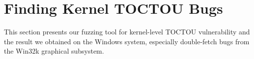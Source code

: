 \section{Finding Kernel TOCTOU Bugs}
\label{sec:experiment}





This section presents our fuzzing tool for kernel-level TOCTOU vulnerability and the result we obtained on the Windows system, especially double-fetch bugs from the Win32k graphical subsystem.


